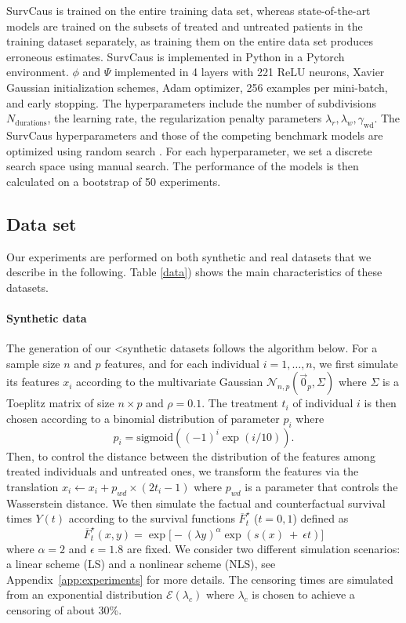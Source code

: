 \documentclass[12pt]{article}
\theoremstyle{plain}
\theoremstyle{definition}
\theoremstyle{remark}
\begin{document}
SurvCaus is trained on the entire training data set, whereas state-of-the-art models are trained on the subsets of treated and untreated patients in the training dataset separately, as training them on the entire data set produces erroneous estimates. SurvCaus is implemented in Python in a Pytorch environment. $\phi$ and $\Psi$ implemented in 4 layers with 221 ReLU neurons, Xavier Gaussian initialization
  schemes, Adam optimizer, 256 examples per mini-batch, and early stopping. The hyperparameters include the number of subdivisions $N_{\text{durations}}$, the learning rate, the regularization penalty parameters $\lambda_r,\lambda_w,\gamma_{\text{wd}}$. The SurvCaus hyperparameters and those of the competing benchmark models are optimized using random search \cite{Bergstra2012RandomSF}. For each hyperparameter, we set a discrete search space using manual search. The performance of the models is then calculated on a bootstrap of 50 experiments. 

\subsection{Data set}

Our experiments are performed on both synthetic and real datasets that we describe in the following. Table \ref{data}) shows the main characteristics of these datasets.

\paragraph{Synthetic data}
The generation of our <synthetic datasets follows the algorithm below. For a sample size $n$ and $p$ features, and for each individual $i=1, \ldots,n$, we first simulate its features $x_i$ according to the multivariate Gaussian $\mathcal{N}_{n,p}(\vec{0}_p,\Sigma)$ where $\Sigma$ is a Toeplitz matrix of size $n \times p$ and $\rho=0.1$. The treatment $t_i$ of individual $i$ is then chosen according to a binomial distribution of parameter $p_{i}$ where 
 \begin{equation*}
     p_{i} =\text{sigmoid}((-1)^i \exp(i/10)).
 \end{equation*}
Then, to control the distance between the distribution of the features among treated individuals and untreated ones, we transform the features via the translation $x_i \gets x_i+ p_{wd} \times (2t_i-1)$
where $p_{wd}$ is a parameter that controls the Wasserstein distance. We then simulate the factual and counterfactual survival times $ Y(t)$  according to the survival functions $ \overline{F}_{t}^{\star}$ ($t=0,1$) defined as
\begin{equation*}
 \overline{F}_{t}^{\star}(x,y) =\exp\Big[ -( \lambda y)^{\alpha}\exp( s(x) \ +\ \epsilon t)\Big]   
\end{equation*}
where $\alpha=2$ and $\epsilon=1.8$ are fixed.
We consider two different simulation scenarios: a linear scheme  (LS) and a nonlinear scheme (NLS), see Appendix~\ref{app:experiments} for more details. The censoring times are simulated from an exponential distribution $\mathcal E(\lambda_c)$ where $\lambda_c$ is chosen to achieve a censoring of about 30\%. 
\end{document}
